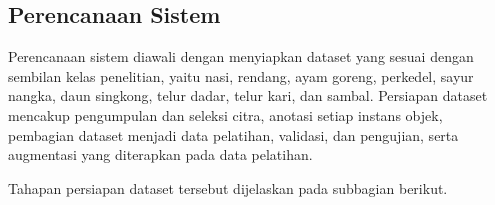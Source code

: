 \subsection{Perencanaan Sistem}

Perencanaan sistem diawali dengan menyiapkan dataset yang sesuai dengan sembilan kelas penelitian, yaitu nasi, rendang, ayam goreng, perkedel, sayur nangka, daun singkong, telur dadar, telur kari, dan sambal. Persiapan dataset mencakup pengumpulan dan seleksi citra, anotasi setiap instans objek, pembagian dataset menjadi data pelatihan, validasi, dan pengujian, serta augmentasi yang diterapkan pada data pelatihan.

Tahapan persiapan dataset tersebut dijelaskan pada subbagian berikut.





